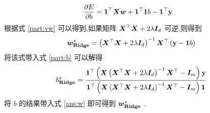 \documentclass[answers]{exam}  %
\begin{document}
\begin{questions}
\begin{solution}
\begin{description}
\begin{align}
				      \frac{\partial E}{\partial b}   & =\boldsymbol{1}^\top\boldsymbol{X}\boldsymbol{w}+\boldsymbol{1}^\top\boldsymbol{1} b-\boldsymbol{1}^\top\mathbf{y}\label{part:b}
			      \end{align}
			      根据式 \ref{part:vw} 可以得到,如果矩阵 $\boldsymbol{X}^\top\boldsymbol{X}+2\lambda\boldsymbol{I}_d$ 可逆,则得到
			      \begin{equation}
				      \boldsymbol{w}_{\mathbf{Ridge}}^{*}=\left(\boldsymbol{X}^\top\boldsymbol{X}+2\lambda\boldsymbol{I}_d\right)^{-1}\boldsymbol{X}^\top\left(\mathbf{y}-\boldsymbol{1} b\right)\label{ans:w}
			      \end{equation}
			      将该式带入式 \ref{part:b} 可以解得
			      \begin{equation*}
				      b_{\mathbf{Ridge}}^{*}=\frac{\boldsymbol{1}^\top\left(\boldsymbol{X}\left(\boldsymbol{X}^\top\boldsymbol{X}+2\lambda\boldsymbol{I}_d\right)^{-1}\boldsymbol{X}^\top-\boldsymbol{I}_m\right)\mathbf y}{\boldsymbol{1}^\top\left(\boldsymbol{X}\left(\boldsymbol{X}^\top\boldsymbol{X}+2\lambda\boldsymbol{I}_d\right)^{-1}\boldsymbol{X}^\top-\boldsymbol{I}_m\right)\boldsymbol{1}}
			      \end{equation*}
			      将 $b$ 的结果带入式 \ref{ans:w} 即可得到 $\boldsymbol{w}_{\mathbf{Ridge}}^{*}$ .
		\end{description}


\end{solution}
\end{questions}
\end{document}
